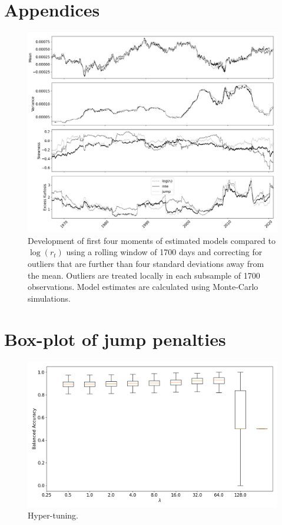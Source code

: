 \newpage

\appendix
\section{Appendices}
\begin{figure}[H] 
    \centering
    \includegraphics[width=1.0\textwidth]{analysis/stylized_facts/images/rolling_moments_outlier_corrected.png}
    \caption{Development of first four moments of estimated models compared to $\log(r_t)$ using a rolling window of 1700 days and correcting for outliers that are further than four standard deviations away from the mean. Outliers are treated locally in each subsample of 1700 observations. Model estimates are calculated using Monte-Carlo simulations.}
\end{figure}
\label{fig:stylized_facts_rolling_moments_outliers_appendix}

\section{Box-plot of jump penalties}
\label{appendix:box_plot}

\begin{figure}[H] 
    \centering
    \includegraphics[width=1\textwidth]{analysis/model_convergence/images/jump_penalties_box.png}
    \caption{Hyper-tuning.}
\end{figure}



